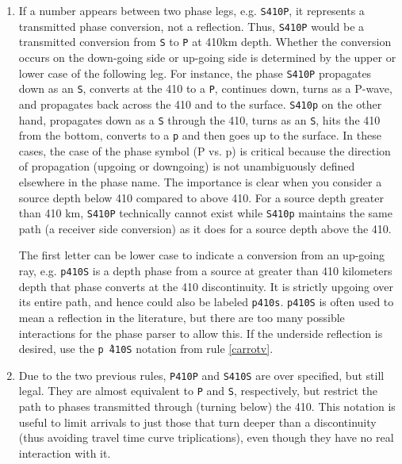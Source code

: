 \begin{enumerate}
\item If a number appears between two phase legs, e.g. \texttt{S410P},
it represents a transmitted phase conversion, not a reflection.
Thus, \texttt{S410P} would be a transmitted conversion
from \texttt{S} to \texttt{P} at 410km depth.
Whether the conversion occurs
on the down-going side or up-going side is determined by the upper or lower
case of the following leg.
For instance, the phase \texttt{S410P}
propagates down as an \texttt{S}, converts at the 410
to a \texttt{P}, continues down, turns as a P-wave, and propagates back across the
410 and to the surface.
\texttt{S410p} on the other hand, propagates down
as a \texttt{S} through the 410, turns as an \texttt{S},
hits the 410 from the bottom, converts to a \texttt{p} and then goes up to the surface.
In these cases, the case of the phase symbol (P vs. p) is critical because the direction
of propagation (upgoing or downgoing) is not unambiguously defined elsewhere in the
phase name.
The importance is clear when you consider a source depth below 410 compared to above 410.
For a source depth greater than 410 km, \texttt{S410P} technically cannot exist while
\texttt{S410p} maintains the same path (a receiver side conversion) as it does for a
source depth above the 410.

The first letter can be lower case to indicate a conversion from
an up-going ray, e.g. \texttt{p410S} is a depth phase from
a source at greater than 410 kilometers depth that phase converts
at the 410 discontinuity.
It is strictly upgoing over
its entire path, and hence could also be labeled \texttt{p410s}.
\texttt{p410S} is often used to mean a reflection in the literature, but there
are too many possible interactions for the phase parser to allow this.
If the underside reflection is desired, use the \texttt{p\^\,410S} notation from
rule \ref{carrotv}.

\item Due to the two previous rules, \texttt{P410P} and \texttt{S410S}
are over specified, but still legal.
They are almost equivalent to \texttt{P} and \texttt{S}, respectively,
but restrict the path to phases transmitted through (turning below) the 410.
This notation is useful to
limit arrivals to just those that turn deeper than a discontinuity (thus avoiding
travel time curve triplications), even though they have no real interaction with it.


\end{enumerate}
